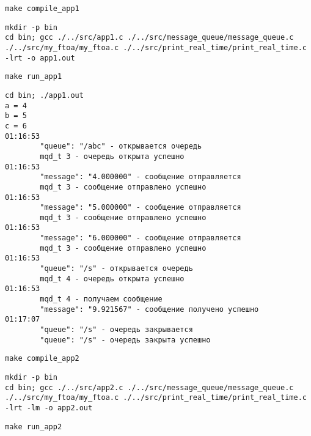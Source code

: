 \begin{lstlisting}[language=Terminal, basicstyle=\ttfamily\scriptsize]
make compile_app1
\end{lstlisting}

\begin{lstlisting}[language=Out, basicstyle=\ttfamily\scriptsize]
mkdir -p bin
cd bin; gcc ./../src/app1.c ./../src/message_queue/message_queue.c ./../src/my_ftoa/my_ftoa.c ./../src/print_real_time/print_real_time.c -lrt -o app1.out
\end{lstlisting}

\begin{lstlisting}[language=Terminal, basicstyle=\ttfamily\scriptsize]
make run_app1
\end{lstlisting}

\begin{lstlisting}[language=Out, basicstyle=\ttfamily\scriptsize]
cd bin; ./app1.out
a = 4
b = 5
c = 6
01:16:53
        "queue": "/abc" - открывается очередь
        mqd_t 3 - очередь открыта успешно
01:16:53
        "message": "4.000000" - сообщение отправляется
        mqd_t 3 - сообщение отправлено успешно
01:16:53
        "message": "5.000000" - сообщение отправляется
        mqd_t 3 - сообщение отправлено успешно
01:16:53
        "message": "6.000000" - сообщение отправляется
        mqd_t 3 - сообщение отправлено успешно
01:16:53
        "queue": "/s" - открывается очередь
        mqd_t 4 - очередь открыта успешно
01:16:53
        mqd_t 4 - получаем сообщение
        "message": "9.921567" - сообщение получено успешно
01:17:07
        "queue": "/s" - очередь закрывается
        "queue": "/s" - очередь закрыта успешно
\end{lstlisting}

\newpage

\begin{lstlisting}[language=Terminal, basicstyle=\ttfamily\scriptsize]
make compile_app2
\end{lstlisting}
    
\begin{lstlisting}[language=Out, basicstyle=\ttfamily\scriptsize]
mkdir -p bin
cd bin; gcc ./../src/app2.c ./../src/message_queue/message_queue.c ./../src/my_ftoa/my_ftoa.c ./../src/print_real_time/print_real_time.c -lrt -lm -o app2.out
\end{lstlisting}
    
\begin{lstlisting}[language=Terminal, basicstyle=\ttfamily\scriptsize]
make run_app2
\end{lstlisting}
    
